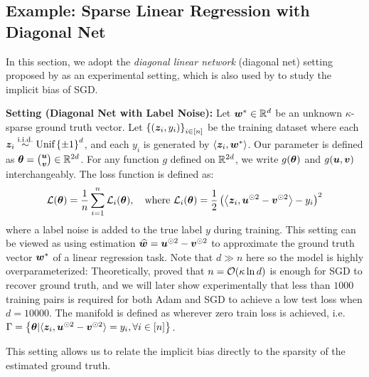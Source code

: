 \subsection{Example: Sparse Linear Regression with Diagonal Net}
In this section, we adopt the \textit{diagonal linear network} (diagonal net) setting proposed by \citet{woodworth2020kernel} as an experimental setting, which is also used by \citet{li2021happens} to study the implicit bias of SGD. 

\textbf{Setting (Diagonal Net with Label Noise):} Let ${\bm{w}}^* \in \mathbb{R}^d$ be an unknown $\kappa$-sparse ground truth vector. Let $\left\{({\bm{z}}_i, y_i)\right\}_{i \in [n]}$ be the training dataset where each ${\bm{z}}_i \overset{\text{i.i.d.}}{\sim} \text{Unif}\left\{\pm 1\right\}^d$, and each $y_i$ is generated by $\left\langle {\bm{z}}_i, {\bm{w}}^* \right\rangle$. Our parameter is defined as ${\bm{\theta}} = \tbinom{{\bm{u}}}{{\bm{v}}} \in \mathbb{R}^{2d}$. For any function $g$ defined on $\mathbb{R}^{2d}$, we write $g({\bm{\theta}})$ and $g({\bm{u}}, {\bm{v}})$ interchangeably. The loss function is defined as:
$$
    \mathcal{L}({\bm{\theta}}) = \frac{1}{n}\sum_{i=1}^{n}\mathcal{L}_i({\bm{\theta}}), \quad \text{where }\mathcal{L}_i({\bm{\theta}}) = \frac{1}{2}\left(\left\langle {\bm{z}}_i, {\bm{u}}^{\odot 2} - {\bm{v}}^{\odot 2} \right\rangle - y_i\right)^2
$$
where a label noise is added to the true label $y$ during training. This setting can be viewed as using estimation $\widehat{{\bm{w}}} = {\bm{u}}^{\odot 2} - {\bm{v}}^{\odot 2}$ to approximate the ground truth vector ${\bm{w}}^*$ of a linear regression task. Note that $d \gg n$ here so the model is highly overparameterized: Theoretically, \citet{li2021happens} proved that $n = \mathcal{O}(\kappa \ln d)$ is enough for SGD to recover ground truth, and we will later show experimentally that less than $1000$ training pairs is required for both Adam and SGD to achieve a low test loss when $d = 10000$. The manifold is defined as wherever zero train loss is achieved, i.e. $\Gamma = \left\{{\bm{\theta}} | \langle {\bm{z}}_i, {\bm{u}}^{\odot 2} - {\bm{v}}^{\odot 2}\rangle = y_i, \forall i \in [n]\right\}$.

This setting allows us to relate the implicit bias directly to the sparsity of the estimated ground truth.


